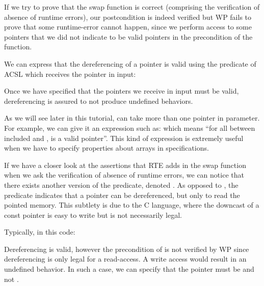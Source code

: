 

If we try to prove that the swap function is correct (comprising the
verification of absence of runtime errors), our postcondition is indeed verified
but WP fails to prove that some runtime-error cannot happen, since we perform
access to some pointers that we did not indicate to be valid pointers in the
precondition of the function.

We can express that the dereferencing of a pointer is valid using the
 predicate of ACSL which receives the
pointer in input:






Once we have specified that the pointers we receive in input must be valid,
dereferencing is assured to not produce undefined behaviors.



As we will see later in this tutorial, 
can take more than one pointer in parameter. For example, we can give it
an expression such as:  which means
``for all  between included  and ,
 is a valid pointer''. This kind of expression is
extremely useful when we have to specify properties about arrays in
specifications.



If we have a closer look at the assertions that RTE adds in the swap function
when we ask the verification of absence of runtime errors, we can notice that
there exists another version of the 
predicate, denoted . As opposed to
, the predicate
 indicates that a pointer can be
dereferenced, but only to read the pointed memory. This subtlety is due to the C
language, where the downcast of a const pointer is easy to write but is not
necessarily legal.



Typically, in this code:






Dereferencing  is valid, however the precondition of
 is not verified by WP since dereferencing
 is only legal for a read-access. A write access would
result in an undefined behavior. In such a case, we can specify that the
pointer  must be  and not
.



